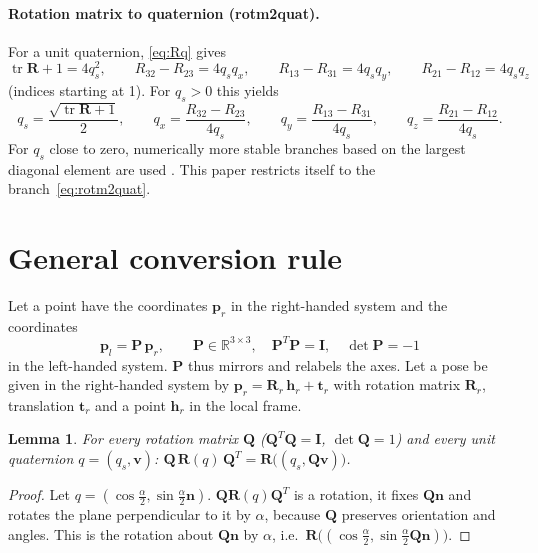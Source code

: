 \documentclass{article}
\theoremstyle{plain}
\newtheorem{lemma}[theorem]{Lemma}
\theoremstyle{definition}
\newcommand{\R}{\mathbb{R}}
\newcommand{\vect}[1]{\boldsymbol{#1}}
\newcommand{\tr}{\operatorname{tr}}
\begin{document}
\paragraph{Rotation matrix to quaternion (rotm2quat).}
For a unit quaternion, \eqref{eq:Rq} gives
\begin{equation}
  \tr \vect R + 1 = 4 q_s^2,\qquad
  R_{32} - R_{23} = 4 q_s q_x,\qquad
  R_{13} - R_{31} = 4 q_s q_y,\qquad
  R_{21} - R_{12} = 4 q_s q_z
\end{equation}
(indices starting at 1). For $q_s > 0$ this yields
\begin{equation}\label{eq:rotm2quat}
  q_s = \frac{\sqrt{\tr \vect R + 1}}{2},\qquad
  q_x = \frac{R_{32} - R_{23}}{4 q_s},\qquad
  q_y = \frac{R_{13} - R_{31}}{4 q_s},\qquad
  q_z = \frac{R_{21} - R_{12}}{4 q_s}.
\end{equation}
For $q_s$ close to zero, numerically more stable branches based on the largest diagonal element
are used \cite{shepperd1978}. This paper restricts itself to the branch~\eqref{eq:rotm2quat}.

\section{General conversion rule}\label{sec:rule}

Let a point have the coordinates $\vect p_r$ in the right-handed system and the coordinates
\begin{equation}
  \vect p_l = \vect P\, \vect p_r, \qquad \vect P \in \R^{3\times3},\quad \vect P^T \vect P = \vect I,\quad \det \vect P = -1
\end{equation}
in the left-handed system. $\vect P$ thus mirrors and relabels the axes. Let a pose be given in the
right-handed system by $\vect p_r = \vect R_r\, \vect h_r + \vect t_r$ with rotation matrix
$\vect R_r$, translation $\vect t_r$ and a point $\vect h_r$ in the local frame.

\begin{lemma}\label{lem:conj}
For every rotation matrix $\vect Q$ ($\vect Q^T \vect Q = \vect I$, $\det \vect Q = 1$) and every
unit quaternion $q = (q_s, \vect v)$:
$\vect Q\, \vect R(q)\, \vect Q^T = \vect R\bigl((q_s, \vect Q \vect v)\bigr)$.
\end{lemma}

\begin{proof}
Let $q = (\cos\frac{\alpha}{2}, \sin\frac{\alpha}{2}\vect n)$. $\vect Q \vect R(q) \vect Q^T$ is a
rotation, it fixes $\vect Q \vect n$ and rotates the plane perpendicular to it by $\alpha$, because
$\vect Q$ preserves orientation and angles. This is the rotation about $\vect Q\vect n$ by
$\alpha$, i.e.\ $\vect R\bigl((\cos\frac{\alpha}{2}, \sin\frac{\alpha}{2}\vect Q\vect n)\bigr)$.
\end{proof}
\end{document}
